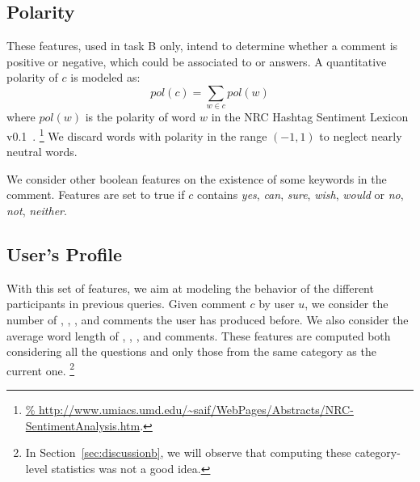 
\subsection{Polarity}
\label{sub:polarity}

These features, used in task B only, intend to determine whether a comment is 
positive or negative, which could be associated to \yes or \no answers. A 
quantitative polarity of $c$ is modeled as:
\begin{equation}
pol(c) = \sum_{w\in c} pol(w) 
\end{equation}
%
where $pol(w)$ is the polarity of word $w$ in the NRC Hashtag Sentiment 
Lexicon v0.1~\cite{MohammadKZ2013}.%
\footnote{\url{%
http://www.umiacs.umd.edu/~saif/WebPages/Abstracts/NRC-SentimentAnalysis.htm}.}
We discard words with polarity in the range $(-1,1)$ to neglect nearly neutral 
words.

We consider other boolean features on the existence of some keywords in the 
comment. Features are set to true if $c$ contains
\Ni \textit{yes}, \textit{can}, \textit{sure}, \textit{wish}, \textit{would} or
\Nii \textit{no}, \textit{not}, \textit{neither}.


\subsection{User's Profile}
\label{sub:profile}

With this set of features, we aim at modeling the behavior of the different 
participants in previous queries. Given comment $c$ by user $u$, we consider 
the number of \good, \bad, \pot, and \dial comments the user has produced 
before. We also consider the average word length of \good, \bad, \pot, and \dial 
comments. These features are computed both considering all the questions and 
only those from the same category as the current one.%
\footnote{In Section~\ref{sec:discussionb}, we will observe that computing 
these category-level statistics was not a good idea.}


